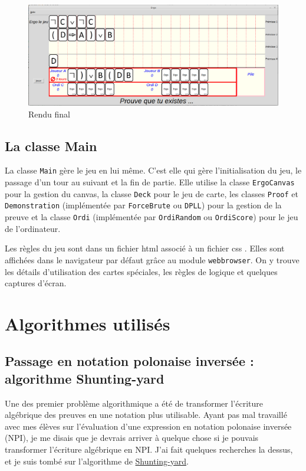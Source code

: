 \documentclass[12pt, algo]{cours}
\begin{document}
\begin{figure}
\begin{center}
\includegraphics[scale=.35]{../images/ima2.png}
\end{center}
\caption{Rendu final}
\label{GI}
\end{figure}

\subsection{La classe Main}

La classe \texttt{Main} gère le jeu en lui même. C'est elle qui gère l'initialisation du jeu, le passage d'un tour au suivant et la fin de partie. Elle utilise la classe \texttt{ErgoCanvas} pour la gestion du canvas, la classe \texttt{Deck} pour le jeu de carte, les classes \texttt{Proof} et \texttt{Demonstration} (implémentée par \texttt{ForceBrute} ou \texttt{DPLL}) pour la gestion de la preuve et la classe \texttt{Ordi} (implémentée par \texttt{OrdiRandom} ou \texttt{OrdiScore}) pour le jeu de l'ordinateur. 

Les règles du jeu sont dans un fichier html associé à un fichier css . Elles sont affichées dans le navigateur par défaut grâce au module \texttt{webbrowser}. On y trouve les détails d'utilisation des cartes spéciales, les règles de logique et quelques captures d'écran.


\section{Algorithmes utilisés}

\subsection{Passage en notation polonaise inversée : algorithme Shunting-yard}

Une des premier problème algorithmique a été de transformer l'écriture algébrique des preuves en une notation plus utilisable. Ayant pas mal travaillé avec mes élèves sur l'évaluation d'une expression en notation polonaise inversée (NPI), je me disais que je devrais arriver à quelque chose si je pouvais transformer l'écriture algébrique en NPI. J'ai fait quelques recherches la dessus, et je suis tombé sur l'algorithme de \href{https://fr.wikipedia.org/wiki/Algorithme_Shunting-yard}{Shunting-yard}.
\end{document}
